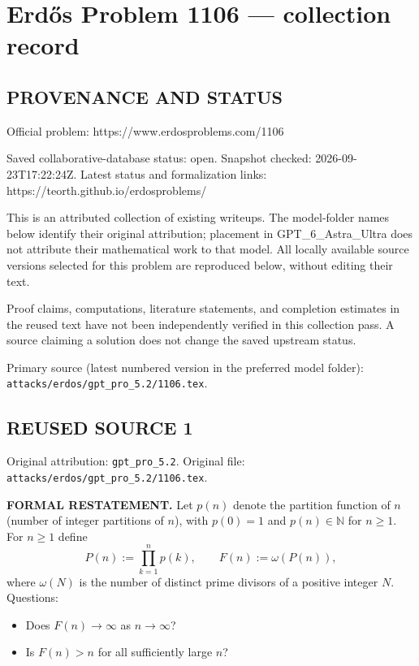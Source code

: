 \section*{Erd\H{o}s Problem 1106 --- collection record}

\subsection*{PROVENANCE AND STATUS}
Official problem: https://www.erdosproblems.com/1106

Saved collaborative-database status: open.
Snapshot checked: 2026-09-23T17:22:24Z.
Latest status and formalization links: https://teorth.github.io/erdosproblems/

This is an attributed collection of existing writeups. The model-folder names below identify their original attribution; placement in GPT\_6\_Astra\_Ultra does not attribute their mathematical work to that model. All locally available source versions selected for this problem are reproduced below, without editing their text.

Proof claims, computations, literature statements, and completion estimates in the reused text have not been independently verified in this collection pass. A source claiming a solution does not change the saved upstream status.

Primary source (latest numbered version in the preferred model folder): \texttt{attacks/erdos/gpt\_pro\_5.2/1106.tex}.

\subsection*{REUSED SOURCE 1}
Original attribution: \texttt{gpt\_pro\_5.2}.
Original file: \texttt{attacks/erdos/gpt\_pro\_5.2/1106.tex}.


\noindent\textbf{FORMAL RESTATEMENT.}
Let $p(n)$ denote the partition function of $n$ (number of integer partitions of $n$), with $p(0)=1$ and $p(n)\in\mathbb N$ for $n\ge 1$.
For $n\ge 1$ define
\[P(n):=\prod_{k=1}^n p(k),\qquad F(n):=\omega(P(n)),
\]
where $\omega(N)$ is the number of distinct prime divisors of a positive integer $N$.
Questions:
\begin{itemize}
\item Does $F(n)\to\infty$ as $n\to\infty$?
\item Is $F(n)>n$ for all sufficiently large $n$?
\end{itemize}

